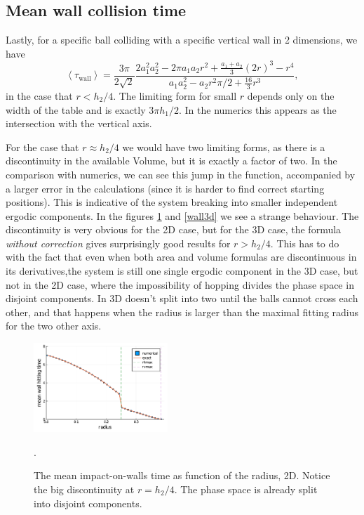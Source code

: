 \documentclass[superscriptaddress,pre,reprint,showpacs,twocolumn]{revtex4-1}
\newcommand{\mean}[1]{\left \langle #1 \right \rangle}
\begin{document}
\subsection{Mean wall collision time}

Lastly, for a specific ball colliding with a specific vertical wall
in 2 dimensions, we have
\begin{equation}\label{impactwall}
 \mean{\tau_\text{wall}} = 	
\frac{3 \pi}{2\sqrt{2}}
\frac { 2a_1^2 a_2^2  -  2\pi a_1 a_2 r^2 + \frac{a_1+a_2}{3}(2r)^3 - r^4}
{a_1a_2^2-a_2 r^2\pi/2 + \frac{16}{3} r^3 },
\end{equation}
in the case that $r<h_2/4$. The limiting form for small $r$ depends
only on the width of the table and is exactly
$3\pi h_1/2$. In the numerics this appears as the intersection with the vertical
axis.

For the case that $r\approx h_2/4$ we would have two limiting forms,
as there is a discontinuity in the available Volume, but it is exactly
a factor of two. In the comparison with numerics, we can see
this jump in the function, accompanied by a larger error in the
calculations (since it is harder to find correct starting positions). 
This is indicative of 
the system breaking into smaller independent ergodic components.
In the figures \ref{wall2d} and \ref{wall3d} we see a strange
behaviour. The discontinuity is very obvious for the 2D case,
but for the 3D case, the formula \emph{without correction}
gives surprisingly good results for $r > h_2/4$. This has to
do with the fact that even when both area and volume
formulas are discontinuous in its derivatives,the system is still
one single ergodic component in the 3D case, but not in the
2D case, where the impossibility of hopping divides the phase space
in disjoint components. In 3D doesn't split into two until
the balls cannot cross each other, and that happens when
the radius is larger than the maximal fitting radius for
the two other axis.  

\begin{figure}[h]
  \centering
  \includegraphics[width=0.45\textwidth]{./figures/wall2d.pdf}
  \caption{The mean impact-on-walls time as function of the radius, 2D.
    Notice the big discontinuity at $r=h_2/4$. The phase space is
  already split into disjoint components.}
    \label{wall2d}.
\end{figure}
\end{document}
